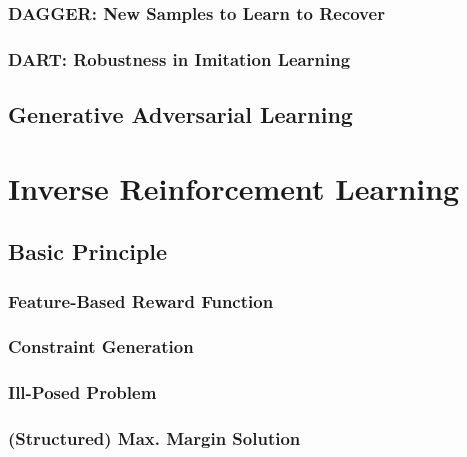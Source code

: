 			\subsubsection{DAGGER: New Samples to Learn to Recover} %

			\subsubsection{DART: Robustness in Imitation Learning} %

		\subsection{Generative Adversarial Learning} %

	\section{Inverse Reinforcement Learning} %

		\subsection{Basic Principle} %

			\subsubsection{Feature-Based Reward Function} %

			\subsubsection{Constraint Generation} %

			\subsubsection{Ill-Posed Problem} %

			\subsubsection{(Structured) Max. Margin Solution} %

